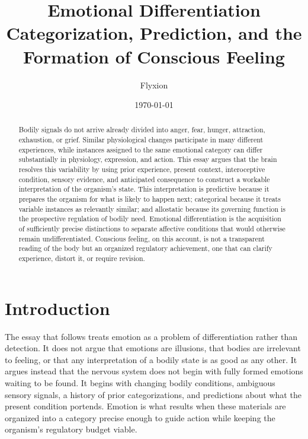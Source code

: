 \documentclass[11pt]{article}
\title{Emotional Differentiation\\
\large Categorization, Prediction, and the Formation of Conscious Feeling}
\author{Flyxion}
\date{\today}
\begin{document}
\maketitle

\begin{abstract}
Bodily signals do not arrive already divided into anger, fear, hunger, attraction, exhaustion, or grief. Similar physiological changes participate in many different experiences, while instances assigned to the same emotional category can differ substantially in physiology, expression, and action. This essay argues that the brain resolves this variability by using prior experience, present context, interoceptive condition, sensory evidence, and anticipated consequence to construct a workable interpretation of the organism's state. This interpretation is predictive because it prepares the organism for what is likely to happen next; categorical because it treats variable instances as relevantly similar; and allostatic because its governing function is the prospective regulation of bodily need. Emotional differentiation is the acquisition of sufficiently precise distinctions to separate affective conditions that would otherwise remain undifferentiated. Conscious feeling, on this account, is not a transparent reading of the body but an organized regulatory achievement, one that can clarify experience, distort it, or require revision.
\end{abstract}

\section*{Introduction}

The essay that follows treats emotion as a problem of differentiation rather than detection. It does not argue that emotions are illusions, that bodies are irrelevant to feeling, or that any interpretation of a bodily state is as good as any other. It argues instead that the nervous system does not begin with fully formed emotions waiting to be found. It begins with changing bodily conditions, ambiguous sensory signals, a history of prior categorizations, and predictions about what the present condition portends. Emotion is what results when these materials are organized into a category precise enough to guide action while keeping the organism's regulatory budget viable.
\end{document}
